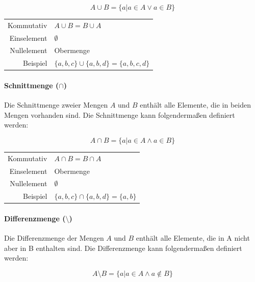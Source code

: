 \documentclass[../main.tex]{subfiles}
\begin{document}
                    \begin{equation}
                        A \cup B = \{a | a \in A \vee a \in B\}
                    \end{equation}
                    
                    \begin{tabular}{ r l }
						Kommutativ & $A \cup B = B \cup A$ \\
						Einselement & $\emptyset$ \\
						Nullelement & Obermenge \\
                    	Beispiel & $\{a, b, c\} \cup \{a, b, d\} = \{a, b, c, d\}$
					\end{tabular}
                    
                \paragraph{Schnittmenge ($\cap$)}
                    Die Schnittmenge zweier Mengen $A$ und $B$ enthält alle Elemente, die in beiden Mengen vorhanden sind. Die Schnittmenge kann folgendermaßen definiert werden:
                    
                    \begin{equation}
                        A \cap B = \{a | a \in A \wedge a \in B\}
                    \end{equation}
                    
                    \begin{tabular}{ r l }
						Kommutativ & $A \cap B = B \cap A$ \\
						Einselement & Obermenge \\
						Nullelement & $\emptyset$ \\
                    	Beispiel & $\{a, b, c\} \cap \{a, b, d\} = \{a, b\}$
					\end{tabular}

                \paragraph{Differenzmenge ($\setminus$)}
                    Die Differenzmenge der Mengen $A$ und $B$ enthält alle Elemente, die in A nicht aber in B enthalten sind. Die Differenzmenge kann folgendermaßen definiert werden:
                    
                    \begin{equation}
                        A \setminus B = \{a | a \in A \wedge a \notin B\}
                    \end{equation}
                    
\end{document}
